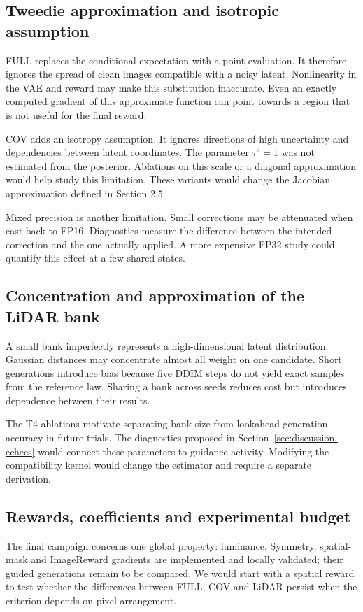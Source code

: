 \documentclass[11pt,a4paper]{article}
\begin{document}
\subsection{Tweedie approximation and isotropic assumption}
FULL replaces the conditional expectation with a point evaluation. It therefore ignores the spread of clean images compatible with a noisy latent. Nonlinearity in the VAE and reward may make this substitution inaccurate. Even an exactly computed gradient of this approximate function can point towards a region that is not useful for the final reward.

COV adds an isotropy assumption. It ignores directions of high uncertainty and dependencies between latent coordinates. The parameter $\tau^2=1$ was not estimated from the posterior. Ablations on this scale or a diagonal approximation would help study this limitation. These variants would change the Jacobian approximation defined in Section 2.5.

Mixed precision is another limitation. Small corrections may be attenuated when cast back to FP16. Diagnostics measure the difference between the intended correction and the one actually applied. A more expensive FP32 study could quantify this effect at a few shared states.

\subsection{Concentration and approximation of the LiDAR bank}
A small bank imperfectly represents a high-dimensional latent distribution. Gaussian distances may concentrate almost all weight on one candidate. Short generations introduce bias because five DDIM steps do not yield exact samples from the reference law. Sharing a bank across seeds reduces cost but introduces dependence between their results.

The T4 ablations motivate separating bank size from lookahead generation accuracy in future trials. The diagnostics proposed in Section~\ref{sec:discussion-echecs} would connect these parameters to guidance activity. Modifying the compatibility kernel would change the estimator and require a separate derivation.

\subsection{Rewards, coefficients and experimental budget}
The final campaign concerns one global property: luminance. Symmetry, spatial-mask and ImageReward gradients are implemented and locally validated; their guided generations remain to be compared. We would start with a spatial reward to test whether the differences between FULL, COV and LiDAR persist when the criterion depends on pixel arrangement.
\end{document}
